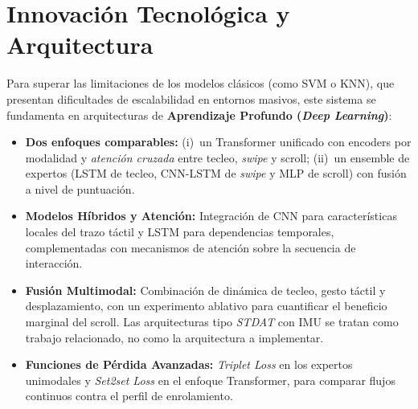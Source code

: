 \section{Innovación Tecnológica y Arquitectura}

Para superar las limitaciones de los modelos clásicos (como SVM o KNN), que presentan dificultades de escalabilidad en entornos masivos, este sistema se fundamenta en arquitecturas de \textbf{Aprendizaje Profundo (\textit{Deep Learning})}:

\begin{itemize}
    \item \textbf{Dos enfoques comparables:} (i)~un Transformer unificado con encoders por modalidad y \textit{atención cruzada} entre tecleo, \textit{swipe} y scroll; (ii)~un ensemble de expertos (LSTM de tecleo, CNN-LSTM de \textit{swipe} y MLP de scroll) con fusión a nivel de puntuación.
    \item \textbf{Modelos Híbridos y Atención:} Integración de CNN para características locales del trazo táctil y LSTM para dependencias temporales, complementadas con mecanismos de atención sobre la secuencia de interacción.
    \item \textbf{Fusión Multimodal:} Combinación de dinámica de tecleo, gesto táctil y desplazamiento, con un experimento ablativo para cuantificar el beneficio marginal del scroll. Las arquitecturas tipo \textit{STDAT} con IMU se tratan como trabajo relacionado, no como la arquitectura a implementar.
    \item \textbf{Funciones de Pérdida Avanzadas:} \textit{Triplet Loss} en los expertos unimodales y \textit{Set2set Loss} en el enfoque Transformer, para comparar flujos continuos contra el perfil de enrolamiento.
\end{itemize}
